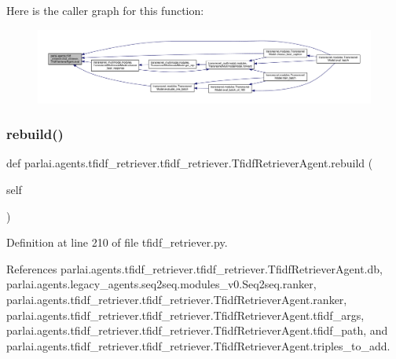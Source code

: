 Here is the caller graph for this function\+:
\nopagebreak
\begin{figure}[H]
\begin{center}
\leavevmode
\includegraphics[width=350pt]{classparlai_1_1agents_1_1tfidf__retriever_1_1tfidf__retriever_1_1TfidfRetrieverAgent_a97a3e0824539ff7df230ccaee5cdda20_icgraph}
\end{center}
\end{figure}
\mbox{\label{classparlai_1_1agents_1_1tfidf__retriever_1_1tfidf__retriever_1_1TfidfRetrieverAgent_a434a29fe242e98aef091ec1e277d420f}} 
\subsubsection{\texorpdfstring{rebuild()}{rebuild()}}
{\footnotesize\ttfamily def parlai.\+agents.\+tfidf\+\_\+retriever.\+tfidf\+\_\+retriever.\+Tfidf\+Retriever\+Agent.\+rebuild (\begin{DoxyParamCaption}\item[{}]{self }\end{DoxyParamCaption})}



Definition at line 210 of file tfidf\+\_\+retriever.\+py.



References parlai.\+agents.\+tfidf\+\_\+retriever.\+tfidf\+\_\+retriever.\+Tfidf\+Retriever\+Agent.\+db, parlai.\+agents.\+legacy\+\_\+agents.\+seq2seq.\+modules\+\_\+v0.\+Seq2seq.\+ranker, parlai.\+agents.\+tfidf\+\_\+retriever.\+tfidf\+\_\+retriever.\+Tfidf\+Retriever\+Agent.\+ranker, parlai.\+agents.\+tfidf\+\_\+retriever.\+tfidf\+\_\+retriever.\+Tfidf\+Retriever\+Agent.\+tfidf\+\_\+args, parlai.\+agents.\+tfidf\+\_\+retriever.\+tfidf\+\_\+retriever.\+Tfidf\+Retriever\+Agent.\+tfidf\+\_\+path, and parlai.\+agents.\+tfidf\+\_\+retriever.\+tfidf\+\_\+retriever.\+Tfidf\+Retriever\+Agent.\+triples\+\_\+to\+\_\+add.



